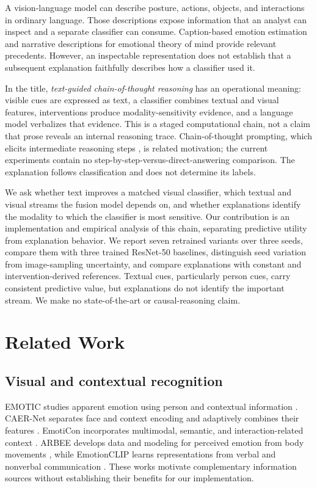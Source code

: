 \documentclass[conference]{IEEEtran}
\begin{document}
A vision-language model can describe posture, actions, objects, and interactions in ordinary language. Those descriptions expose information that an analyst can inspect and a separate classifier can consume. Caption-based emotion estimation \cite{captions} and narrative descriptions for emotional theory of mind \cite{etom} provide relevant precedents. However, an inspectable representation does not establish that a subsequent explanation faithfully describes how a classifier used it.

In the title, \emph{text-guided chain-of-thought reasoning} has an operational meaning: visible cues are expressed as text, a classifier combines textual and visual features, interventions produce modality-sensitivity evidence, and a language model verbalizes that evidence. This is a staged computational chain, not a claim that prose reveals an internal reasoning trace. Chain-of-thought prompting, which elicits intermediate reasoning steps \cite{cot}, is related motivation; the current experiments contain no step-by-step-versus-direct-answering comparison. The explanation follows classification and does not determine its labels.

We ask whether text improves a matched visual classifier, which textual and visual streams the fusion model depends on, and whether explanations identify the modality to which the classifier is most sensitive. Our contribution is an implementation and empirical analysis of this chain, separating predictive utility from explanation behavior. We report seven retrained variants over three seeds, compare them with three trained ResNet-50 baselines, distinguish seed variation from image-sampling uncertainty, and compare explanations with constant and intervention-derived references. Textual cues, particularly person cues, carry consistent predictive value, but explanations do not identify the important stream. We make no state-of-the-art or causal-reasoning claim.

\section{Related Work}\label{sec:related}
\subsection{Visual and contextual recognition}
EMOTIC studies apparent emotion using person and contextual information \cite{emotic}. CAER-Net separates face and context encoding and adaptively combines their features \cite{caer}. EmotiCon incorporates multimodal, semantic, and interaction-related context \cite{emoticon}. ARBEE develops data and modeling for perceived emotion from body movements \cite{arbee}, while EmotionCLIP learns representations from verbal and nonverbal communication \cite{emotionclip}. These works motivate complementary information sources without establishing their benefits for our implementation.
\end{document}
